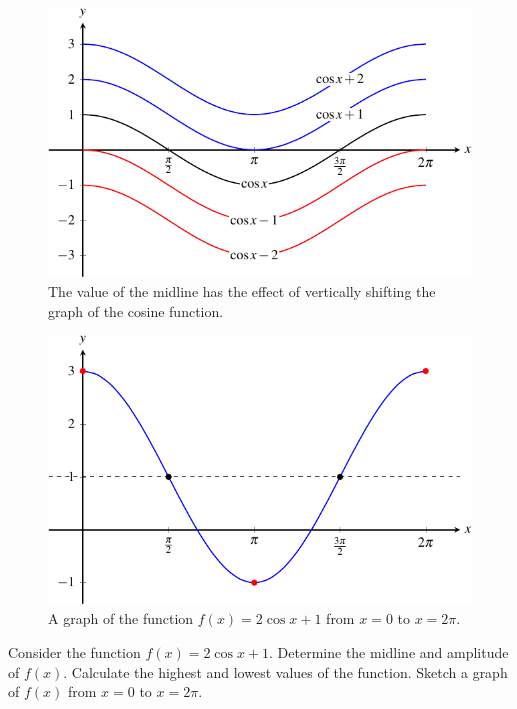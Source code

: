 \documentclass[a4paper,oneside,12pt]{article}
\begin{document}
\begin{figure}[!htbp]
\centering
\includegraphics[scale=1.1]{image/13/cos-vertical-shift.pdf}
\caption{%
  The value of the midline has the effect of vertically shifting the
  graph of the cosine function.
}
\label{fig:trigonometric:cos_vertical_shift}
\end{figure}

\begin{figure}[!htbp]
\centering
\includegraphics[scale=1.1]{image/13/2-cos-3.pdf}
\caption{%
  A graph of the function $f(x) = 2 \cos x + 1$ from $x = 0$ to
  $x = 2\pi$.
}
\label{fig:trigonometric:2_cos_1}
\end{figure}

\begin{example}
Consider the function $f(x) = 2 \cos x + 1$.  Determine the midline
and amplitude of $f(x)$.  Calculate the highest and lowest values of
the function.  Sketch a graph of $f(x)$ from $x = 0$ to $x = 2\pi$.
\end{example}
\end{document}
